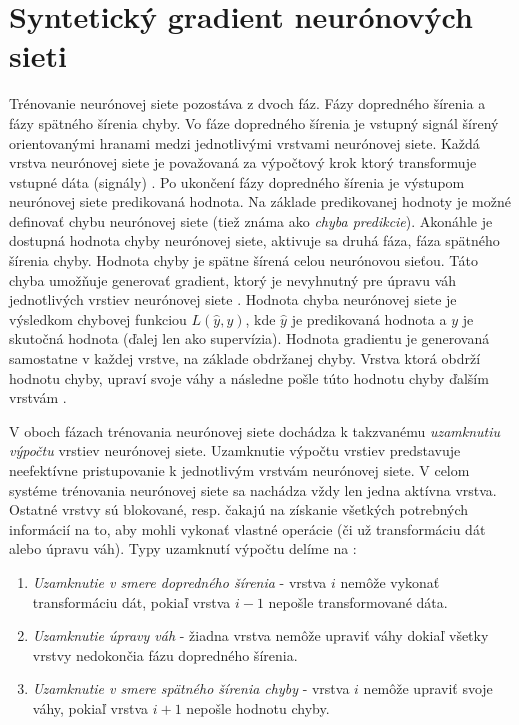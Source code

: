 \chapter{Syntetický gradient neurónových sieti}

\label{synth_grad} %

Trénovanie neurónovej siete pozostáva z dvoch fáz. Fázy dopredného šírenia a fázy spätného šírenia chyby. Vo fáze dopredného šírenia je vstupný signál šírený orientovanými hranami medzi jednotlivými vrstvami neurónovej siete. Každá vrstva neurónovej siete je považovaná za výpočtový krok ktorý transformuje vstupné dáta (signály) \cite{Jaderberg2016}. Po ukončení fázy dopredného šírenia je výstupom neurónovej siete predikovaná hodnota. Na základe predikovanej hodnoty je možné definovať chybu neurónovej siete (tiež známa ako \textit{chyba predikcie}). Akonáhle je dostupná hodnota chyby neurónovej siete, aktivuje sa druhá fáza, fáza spätného šírenia chyby. Hodnota chyby je spätne šírená celou neurónovou sieťou. Táto chyba umožňuje generovať gradient, ktorý je nevyhnutný pre úpravu váh jednotlivých vrstiev neurónovej siete \cite{Jaderberg2016}. Hodnota chyba neurónovej siete je výsledkom chybovej funkciou $L(\hat{y}, y)$, kde $\hat{y}$ je predikovaná hodnota a $y$ je skutočná hodnota (ďalej len ako supervízia). Hodnota gradientu je generovaná samostatne v každej vrstve, na základe obdržanej chyby. Vrstva ktorá obdrží hodnotu chyby, upraví svoje váhy a následne pošle túto hodnotu chyby ďalším vrstvám \cite{Goh1995, Czarnecki2017}. 

V oboch fázach trénovania neurónovej siete dochádza k takzvanému \textit{uzamknutiu výpočtu} vrstiev neurónovej siete. Uzamknutie výpočtu vrstiev predstavuje neefektívne pristupovanie k jednotlivým vrstvám neurónovej siete. V celom systéme trénovania neurónovej siete sa nachádza vždy len jedna aktívna vrstva. Ostatné vrstvy sú blokované, resp. čakajú na získanie všetkých potrebných informácií na to, aby mohli vykonať vlastné operácie (či už transformáciu dát alebo úpravu váh). Typy uzamknutí výpočtu delíme na \cite{Jaderberg2016}:
\begin{enumerate}
\item  \textit{Uzamknutie v smere dopredného šírenia} - vrstva $i$ nemôže vykonať transformáciu dát, pokiaľ vrstva $i-1$ nepošle transformované dáta.
\item  \textit{Uzamknutie úpravy váh} - žiadna vrstva nemôže upraviť váhy dokiaľ všetky vrstvy nedokončia fázu dopredného šírenia.
\item  \textit{Uzamknutie v smere spätného šírenia chyby} - vrstva $i$ nemôže upraviť svoje váhy, pokiaľ vrstva $i+1$ nepošle hodnotu chyby.
\end{enumerate}

